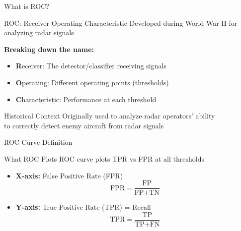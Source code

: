 \documentclass{beamer}
\begin{document}
\begin{frame}{What is ROC?}
\begin{definitionbox}{ROC: Receiver Operating Characteristic}
Developed during World War II for analyzing radar signals

\vspace{0.3cm}

\textbf{Breaking down the name:}
\begin{itemize}
    \item \textbf{R}eceiver: The detector/classifier receiving signals
    \item \textbf{O}perating: Different operating points (thresholds)
    \item \textbf{C}haracteristic: Performance at each threshold
\end{itemize}
\end{definitionbox}

\vspace{0.3cm}

\begin{keypointsbox}{Historical Context}
Originally used to analyze radar operators' ability \\
to correctly detect enemy aircraft from radar signals
\end{keypointsbox}
\end{frame}

\begin{frame}{ROC Curve Definition}
\begin{definitionbox}{What ROC Plots}
ROC curve plots TPR vs FPR at all thresholds

\vspace{0.3cm}

\begin{itemize}
    \item \textbf{X-axis:} False Positive Rate (FPR)
    $$\text{FPR} = \frac{\text{FP}}{\text{FP} + \text{TN}}$$

    \item \textbf{Y-axis:} True Positive Rate (TPR) = Recall
    $$\text{TPR} = \frac{\text{TP}}{\text{TP} + \text{FN}}$$
\end{itemize}
\end{definitionbox}
\end{frame}
\end{document}
